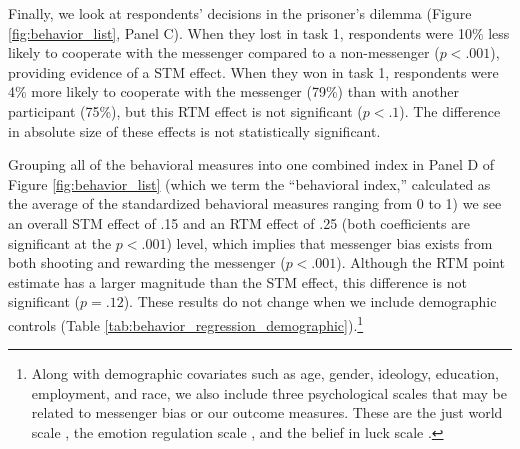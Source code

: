 Finally, we look at respondents' decisions in the prisoner's dilemma
(Figure \ref{fig:behavior_list}, Panel C). When they lost in task 1, respondents were
10\% less likely to cooperate with the messenger compared to a
non-messenger ($p < .001$), providing evidence of a STM
effect. When they won in task 1, respondents were 4\% more likely to
cooperate with the messenger (79\%) than with another participant
(75\%), but this RTM effect is not significant ($p < .1$).
The difference in absolute size of these effects is not statistically
significant.

Grouping all of the behavioral measures into one combined index in
Panel D of Figure \ref{fig:behavior_list} (which we term the ``behavioral index,''
calculated as the average of the standardized behavioral measures
ranging from 0 to 1) we see an overall
STM effect of .15 and an RTM effect of .25 (both coefficients are
significant at the $p < .001$) level, which implies that
messenger bias exists from both shooting and rewarding the messenger
($p < .001$). Although the RTM point estimate has a larger
magnitude than the STM effect, this difference is not significant ($p
= .12$). These results do not change when we include
demographic controls (Table \ref{tab:behavior_regression_demographic}).\footnote{Along with demographic covariates such as age, gender, ideology,
education, employment, and race, we also include three psychological scales that may be
related to messenger bias or our outcome measures. These are the just world
scale \citep{lipkus1991construction}, the emotion regulation scale \citep{buss1992aggression}, and the
belief in luck scale \citep{darke1997belief}.}



